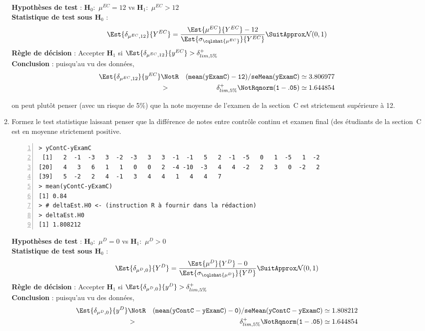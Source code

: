 \documentclass[10pt]{report}
\begin{document}
\begin{exercice}
\begin{enumerate}
\begin{Correction}
\noindent \textbf{Hypothèses de test} : $\mathbf{H}_0:$ $\mu^{EC}=12$ vs {\large $\mathbf{H}_1:$ $\mu^{EC}>12$}\\
\textbf{Statistique de test sous $\mathbf{H}_0$} :
  $$
  \Est{\delta_{\mu^{EC},12}}{Y^{EC}}= {\displaystyle \frac{\Est{\mu^{EC}}{Y^{EC}}-12}{
\Est{\sigma_{\cqlshat{\mu^{EC}}}}{Y^{EC}}
}} 
  \SuitApprox \mathcal{N}(0,1)
  $$
\textbf{Règle de décision} : Accepter $\mathbf{H}_1$ si 
  $\Est{\delta_{\mu^{EC},12}}{y^{EC}} > \delta^+_{lim,5\%}$\\
\noindent \textbf{Conclusion} :
puisqu'au vu des données, 
  \begin{eqnarray*}
\Est{\delta_{\mu^{EC},12}}{y^{EC}} &\NotR&\mathtt{(mean(yExamC)-12)/seMean(yExamC)}\simeq 3.806977\\& >  & \delta^+_{lim,5\%} \NotR \mathtt{qnorm(1-.05)}\simeq1.644854
\end{eqnarray*}
  
on peut plutôt penser (avec un risque de 5\%) que la note moyenne de l'examen de la section~C est strictement supérieure à 12.
\end{Correction}



\item Formez le test statistique laissant penser que la diff{\'e}rence de notes entre contr{\^o}le continu et examen final (des {\'e}tudiants de la section~C est en moyenne strictement positive.

\IndicR
\begin{Verbatim}[frame=leftline,fontfamily=tt,fontshape=n,numbers=left]
> yContC-yExamC
 [1]   2  -1  -3   3  -2  -3   3   3  -1  -1   5   2  -1  -5   0   1  -5   1  -2
[20]   4   3   6   1   1   0   0   2  -4 -10  -3   4   4  -2   2   3   0  -2   2
[39]   5  -2   2   4  -1   3   4   4   1   4   4   7
> mean(yContC-yExamC)
[1] 0.84
> # deltaEst.H0 <- (instruction R à fournir dans la rédaction)
> deltaEst.H0
[1] 1.808212
\end{Verbatim}

 

\begin{Correction}

\noindent \textbf{Hypothèses de test} : $\mathbf{H}_0:$ $\mu^{D}=0$ vs {\large $\mathbf{H}_1:$ $\mu^{D}>0$}\\
\textbf{Statistique de test sous $\mathbf{H}_0$} :
  $$
  \Est{\delta_{\mu^{D},0}}{Y^{D}}= {\displaystyle \frac{\Est{\mu^{D}}{Y^{D}}-0}{
\Est{\sigma_{\cqlshat{\mu^{D}}}}{Y^{D}}
}} 
  \SuitApprox \mathcal{N}(0,1)
  $$
\textbf{Règle de décision} : Accepter $\mathbf{H}_1$ si 
  $\Est{\delta_{\mu^{D},0}}{y^{D}} > \delta^+_{lim,5\%}$\\
\noindent \textbf{Conclusion} :
puisqu'au vu des données, 
  \begin{eqnarray*}
\Est{\delta_{\mu^{D},0}}{y^{D}} &\NotR&\mathtt{(mean(yContC-yExamC)-0)/seMean(yContC-yExamC)}\simeq 1.808212\\& >  & \delta^+_{lim,5\%} \NotR \mathtt{qnorm(1-.05)}\simeq1.644854
\end{eqnarray*}
  

\end{Correction}
\end{enumerate}
\end{exercice}
\end{document}
